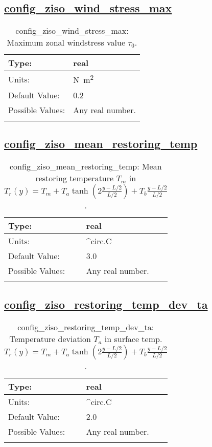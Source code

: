 \subsection[config\_ziso\_wind\_stress\_max]{\hyperref[sec:nm_tab_ziso]{config\_ziso\_wind\_stress\_max}}
\label{subsec:nm_sec_config_ziso_wind_stress_max}
\begin{center}
\begin{longtable}{| p{2.0in} || p{4.0in} |}
    \hline
    Type: & real \\
    \hline
    Units: & \si{N.m^{2}} \\
    \hline
    Default Value: & 0.2 \\
    \hline
    Possible Values: & Any real number. \\
    \hline
    \caption{config\_ziso\_wind\_stress\_max: Maximum zonal windstress value $\tau_0$.}
\end{longtable}
\end{center}
\subsection[config\_ziso\_mean\_restoring\_temp]{\hyperref[sec:nm_tab_ziso]{config\_ziso\_mean\_restoring\_temp}}
\label{subsec:nm_sec_config_ziso_mean_restoring_temp}
\begin{center}
\begin{longtable}{| p{2.0in} || p{4.0in} |}
    \hline
    Type: & real \\
    \hline
    Units: & \si{^{circ}.C} \\
    \hline
    Default Value: & 3.0 \\
    \hline
    Possible Values: & Any real number. \\
    \hline
    \caption{config\_ziso\_mean\_restoring\_temp: Mean restoring temperature $T_m$ in $T_r(y) = T_m + T_a \tanh\left(2\frac{y-L/2}{L/2}\right) + T_b \frac{y-L/2}{L/2}$.}
\end{longtable}
\end{center}
\subsection[config\_ziso\_restoring\_temp\_dev\_ta]{\hyperref[sec:nm_tab_ziso]{config\_ziso\_restoring\_temp\_dev\_ta}}
\label{subsec:nm_sec_config_ziso_restoring_temp_dev_ta}
\begin{center}
\begin{longtable}{| p{2.0in} || p{4.0in} |}
    \hline
    Type: & real \\
    \hline
    Units: & \si{^{circ}.C} \\
    \hline
    Default Value: & 2.0 \\
    \hline
    Possible Values: & Any real number. \\
    \hline
    \caption{config\_ziso\_restoring\_temp\_dev\_ta: Temperature deviation $T_a$ in surface temp. $T_r(y) = T_m + T_a \tanh\left(2\frac{y-L/2}{L/2}\right) + T_b \frac{y-L/2}{L/2}$.}
\end{longtable}
\end{center}
